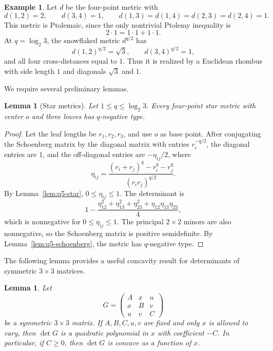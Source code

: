 \documentclass[12pt]{amsart}
\newtheorem{lemma}[theorem]{Lemma}
\theoremstyle{definition}
\newtheorem{example}[theorem]{Example}
\newcommand{\1}{\mathbf{1}}
\begin{document}
\begin{example}
\label{ex:q5-rhombus}
Let $d$ be the four-point metric with
\[
        d(1,2)=2,\qquad d(3,4)=1,
        \qquad
        d(1,3)=d(1,4)=d(2,3)=d(2,4)=1.
\]
This metric is Ptolemaic, since the only nontrivial Ptolemy inequality is
\[
        2\cdot 1=1\cdot1+1\cdot1.
\]
At $q=\log_2 3$, the snowflaked metric $d^{q/2}$ has
\[
        d(1,2)^{q/2}=\sqrt3,\qquad d(3,4)^{q/2}=1,
\]
and all four cross-distances equal to $1$.  Thus it is realized by a Euclidean
rhombus with side length $1$ and diagonals $\sqrt3$ and $1$.  
\end{example}

We require several preliminary lemmas. 

\begin{lemma}[Star metrics]
\label{lem:q5-star-metrics}
Let $1\le q\le \log_2 3$.  Every four-point star metric with center $o$ and
three leaves has $q$-negative type.
\end{lemma}

\begin{proof}
Let the leaf lengths be $r_1,r_2,r_3$, and use $o$ as base point.  After
conjugating the Schoenberg matrix by the diagonal matrix with entries $r_i^{-q/2}$,
the diagonal entries are $1$, and the off-diagonal entries are $-\eta_{ij}/2$, where
\[
        \eta_{ij}=\frac{(r_i+r_j)^q-r_i^q-r_j^q}{(r_ir_j)^{q/2}}.
\]
By Lemma~\ref{lem:q5-star}, $0\le \eta_{ij}\le1$.  The determinant is
\[
        1-\frac{\eta_{12}^2+\eta_{13}^2+\eta_{23}^2+\eta_{12}\eta_{13}\eta_{23}}{4},
\]
which is nonnegative for $0\le\eta_{ij}\le1$.  The principal $2\times2$ minors
are also nonnegative, so the Schoenberg matrix is positive semidefinite.  By
Lemma~\ref{lem:q5-schoenberg}, the metric has $q$-negative type.
\end{proof}

The following lemma provides a useful concavity result for determinants of symmetric $3 \times 3$ matrices.

\begin{lemma}
\label{lem:q5-one-entry-concavity}
Let
\[
        G=
        \begin{pmatrix}
        A & x & u\\
        x & B & v\\
        u & v & C
        \end{pmatrix}
\]
be a symmetric $3\times3$ matrix.  If $A,B,C,u,v$ are fixed and only $x$ is
allowed to vary, then $\det G$ is a quadratic polynomial in $x$ with coefficient
$-C$.  In particular, if $C\ge0$, then $\det G$ is concave as a function of
$x$.
\end{lemma}
\end{document}
